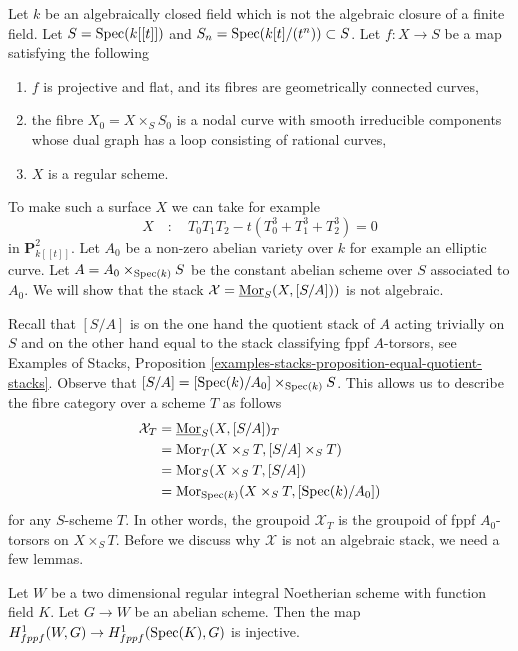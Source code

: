 \medskip\noindent
Let $k$ be an algebraically closed field which is not the algebraic
closure of a finite field. Let $S = \mathop{\mathrm{Spec}}(k[[t]])$
and $S_n = \mathop{\mathrm{Spec}}(k[t]/(t^n)) \subset S$. Let $f : X \to S$ be a map
satisfying the following
\begin{enumerate}
\item $f$ is projective and flat, and its fibres are geometrically
connected curves,
\item the fibre $X_0 = X \times_S S_0$ is a nodal curve with smooth
irreducible components whose dual graph has a loop consisting of
rational curves,
\item $X$ is a regular scheme.
\end{enumerate}
To make such a surface $X$ we can take for example
$$
X\quad :\quad T_0T_1T_2 - t(T_0^3 + T_1^3 + T_2^3) = 0
$$
in $\mathbf{P}^2_{k[[t]]}$. Let $A_0$ be a non-zero abelian variety over $k$
for example an elliptic curve.  Let $A = A_0 \times_{\mathop{\mathrm{Spec}}(k)} S$ be the
constant abelian scheme
over $S$ associated to $A_0$. We will show that the
stack $\mathcal{X} = \underline{\mathop{\mathrm{Mor}}\nolimits}_S(X, [S/A]))$ is not algebraic.

\medskip\noindent
Recall that $[S/A]$ is on the one hand the quotient stack of $A$ acting
trivially on $S$ and on
the other hand equal to the stack classifying fppf $A$-torsors, see
Examples of Stacks, Proposition
\ref{examples-stacks-proposition-equal-quotient-stacks}.
Observe that $[S/A] = [\mathop{\mathrm{Spec}}(k)/A_0] \times_{\mathop{\mathrm{Spec}}(k)} S$. This allows
us to describe the fibre category over a scheme $T$ as follows
\begin{align*}
\mathcal{X}_T
& =
\underline{\mathop{\mathrm{Mor}}\nolimits}_S(X, [S/A])_T \\
& =
\mathop{\mathrm{Mor}}\nolimits_T(X \times_S T, [S/A] \times_S T) \\
& =
\mathop{\mathrm{Mor}}\nolimits_S(X \times_S T, [S/A]) \\
& =
\mathop{\mathrm{Mor}}\nolimits_{\mathop{\mathrm{Spec}}(k)}(X \times_S T, [\mathop{\mathrm{Spec}}(k)/A_0])
\end{align*}
for any $S$-scheme $T$. In other words, the groupoid $\mathcal{X}_T$
is the groupoid of fppf $A_0$-torsors on $X \times_S T$.
Before we discuss why $\mathcal{X}$ is not an algebraic stack,
we need a few lemmas.

\begin{lemma}
\label{lemma-torsors-over-two-dimensional-regular}
Let $W$ be a two dimensional regular integral Noetherian scheme
with function field $K$. Let $G \to W$ be an abelian scheme.
Then the map $H^1_{fppf}(W, G) \to H^1_{fppf}(\mathop{\mathrm{Spec}}(K), G)$
is injective.
\end{lemma}

